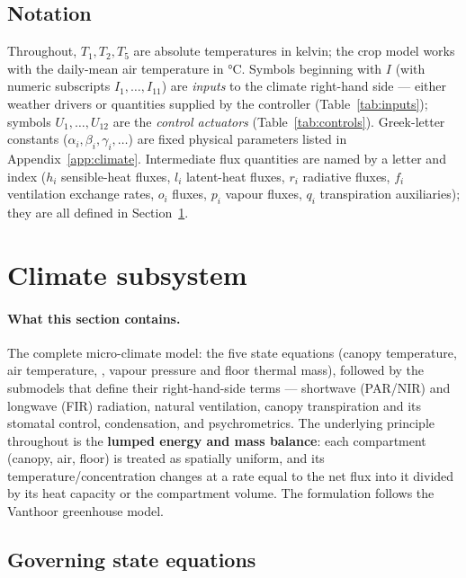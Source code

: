 \documentclass[11pt,a4paper]{article}
\newcommand{\Tcan}{T_{1}}
\newcommand{\Tair}{T_{2}}
\newcommand{\Tflo}{T_{5}}
\begin{document}
\subsection{Notation}
Throughout, $\Tcan,\Tair,\Tflo$ are absolute temperatures in kelvin; the crop model works with the
daily-mean air temperature in \si{\degreeCelsius}. Symbols beginning with $I$ (with numeric
subscripts $I_1,\dots,I_{11}$) are \emph{inputs} to the climate right-hand side --- either weather
drivers or quantities supplied by the controller (Table~\ref{tab:inputs}); symbols
$U_1,\dots,U_{12}$ are the \emph{control actuators} (Table~\ref{tab:controls}). Greek-letter
constants ($\alpha_i,\beta_i,\gamma_i,\dots$) are fixed physical parameters listed in
Appendix~\ref{app:climate}. Intermediate flux quantities are named by a letter and index
($h_i$ sensible-heat fluxes, $l_i$ latent-heat fluxes, $r_i$ radiative fluxes, $f_i$ ventilation
exchange rates, $o_i$  fluxes, $p_i$ vapour fluxes, $q_i$ transpiration auxiliaries); they
are all defined in Section~\ref{sec:climate}.

\section{Climate subsystem}\label{sec:climate}

\paragraph{What this section contains.} The complete micro-climate model: the five state
equations (canopy temperature, air temperature, , vapour pressure and floor thermal mass),
followed by the submodels that define their right-hand-side terms --- shortwave (PAR/NIR) and
longwave (FIR) radiation, natural ventilation, canopy transpiration and its stomatal control,
condensation, and psychrometrics. The underlying principle throughout is the \textbf{lumped
energy and mass balance}: each compartment (canopy, air, floor) is treated as spatially uniform,
and its temperature/concentration changes at a rate equal to the net flux into it divided by its
heat capacity or the compartment volume. The formulation follows the Vanthoor greenhouse model.

\subsection{Governing state equations}
\end{document}
